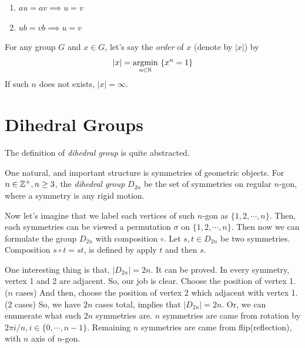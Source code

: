 \documentclass[12pt, a4paper, openany, twoside]{book}
\theoremstyle{definition}
\theoremstyle{remark}
\theoremstyle{plain}
\numberwithin{equation}{section}
\begin{document}
\begin{tcolorbox}[colback=yellow!10!white,colframe=red!75!black,title=Cancellation Laws hold in $G$]
\begin{enumerate}
    \item $au = av \implies u = v$
    \item $ub = vb \implies u = v$
\end{enumerate}

\end{tcolorbox}

\begin{tcolorbox}[colback=yellow!10!white,colframe=brown!75!black,title=Group order]

For any group $G$ and $x \in G$, let's say the \textit{order} of $x$ (denote by $|x|$) by 
\[|x| = \underset{n \in {\mathbb {N}}}{\text{argmin}}~\{ x^{n} = 1\}\]
If such $n$ does not exists, $|x| = \infty$. 

\end{tcolorbox}

\newpage 

\section{Dihedral Groups}

The definition of \textit{dihedral group} is quite abstracted. 

\begin{tcolorbox}[colback=yellow!10!white,colframe=brown!75!black,title=Dihedral Groups]
One natural, and important structure is symmetries of geometric objects. For $n \in {\mathbb {Z}}^{+}, n \geq 3$, the \textit{dihedral group} $D_{2n}$ 
be the set of symmetries on regular $n$-gon, where a symmetry is any rigid motion. 
\end{tcolorbox}

Now let's imagine that we label each vertices of such $n$-gon as $\{1, 2, \cdots, n\}$. 
Then, each symmetries can be viewed a permutation $\sigma$ on $\{1, 2, \cdots, n\}$. 
Then now we can formulate the group $D_{2n}$ with composition $\circ$. Let $s, t \in D_{2n}$ be two symmetries. 
Composition $s\circ t = st$, is defined by apply $t$ and then $s$. 

One interesting thing is that, $|D_{2n}| = 2n$. It can be proved. In every symmetry, vertex 1 and 2 are adjacent. 
So, our job is clear. Choose the position of vertex 1. ($n$ cases) And then, choose the position of vertex 2 which adjacent with vertex 1. (2 cases) So, we have $2n$ cases total, implies that $|D_{2n}| = 2n$. 
Or, we can enumerate what such $2n$ symmetries are. $n$ symmetries are came from rotation by $2\pi i / n, i \in \{0, \cdots, n-1\}$. Remaining $n$ symmetries are came from flip(reflection), with $n$ axis of $n$-gon. 
\end{document}
